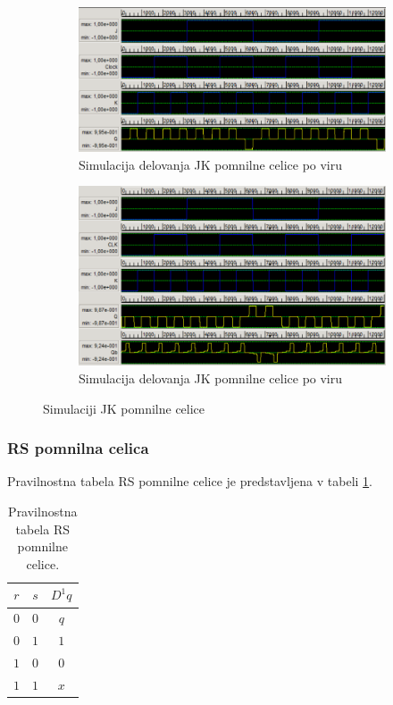 \documentclass[a4paper, 11pt]{article}
\begin{document}
\begin{figure}[h!]
	\begin{subfigure}[b]{\textwidth}
	\includegraphics[width=\textwidth]{../img/vir_4/sim_jk.png}
	\caption{Simulacija delovanja JK pomnilne celice po viru \cite{quantum_dot}}
	\label{fig-jk-1-sim}
	\end{subfigure}
	\begin{subfigure}[b]{\textwidth}
	\includegraphics[width=\textwidth]{../img/vir_5/sim_jk.png}
	\caption{Simulacija delovanja JK pomnilne celice po viru \cite{a_novel_approach}}
	\label{fig-jk-2-sim}
	\end{subfigure}
	\caption{Simulaciji JK pomnilne celice}
	\label{fig-jk-sim}
\end{figure}

\subsubsection{RS pomnilna celica}
Pravilnostna tabela RS pomnilne celice je predstavljena v tabeli \ref{tab-rs}.
\begin{table}[h!]
	\centering
	\small
	\begin{tabular}{cc|c}
	$r$ & $s$ & $D^1q$ \\
	\hline
	$0$ & $0$ & $q$ \\
	$0$ & $1$ & $1$ \\
	$1$ & $0$ & $0$ \\
	$1$ & $1$ & $x$ \\
	\end{tabular}
	\caption{Pravilnostna tabela RS pomnilne celice.}
	\label{tab-rs}
\end{table}
\end{document}
